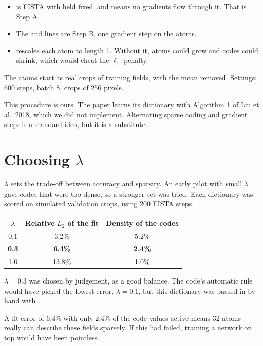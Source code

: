 \begin{itemize}
\item {} is FISTA with  held fixed, and  means no gradients flow
through it. That is Step A.
\item The  and  lines are Step B, one gradient step on the atoms.
\item {} rescales each atom to length 1. Without it, atoms could grow and codes could
shrink, which would cheat the $\ell_1$ penalty.
\end{itemize}

The atoms start as real crops of training fields, with the mean removed. Settings: 600 steps, batch 8,
crops of 256 pixels.

\begin{careful}
This procedure is ours. The paper learns its dictionary with Algorithm 1 of Liu et al.\ 2018, which we did
not implement. Alternating sparse coding and gradient steps is a standard idea, but it is a substitute.
\end{careful}

\section{Choosing $\lambda$}

$\lambda$ sets the trade-off between accuracy and sparsity. An early pilot with small $\lambda$ gave codes
that were too dense, so a stronger set was tried. Each dictionary was scored on simulated validation crops,
using 200 FISTA steps.

\begin{center}
\begin{tabular}{ccc}
\toprule
$\lambda$ & Relative $L_2$ of the fit & Density of the codes \\
\midrule
0.1 & 3.2\% & 5.2\% \\
\textbf{0.3} & \textbf{6.4\%} & \textbf{2.4\%} \\
1.0 & 13.8\% & 1.0\% \\
\bottomrule
\end{tabular}
\end{center}

$\lambda=0.3$ was chosen by judgement, as a good balance. The code's automatic rule would have picked
the lowest error, $\lambda=0.1$, but this dictionary was passed in by hand with .

\begin{keyidea}
A fit error of 6.4\% with only 2.4\% of the code values active means 32 atoms really can describe
these fields sparsely. If this had failed, training a network on top would have been pointless.
\end{keyidea}

